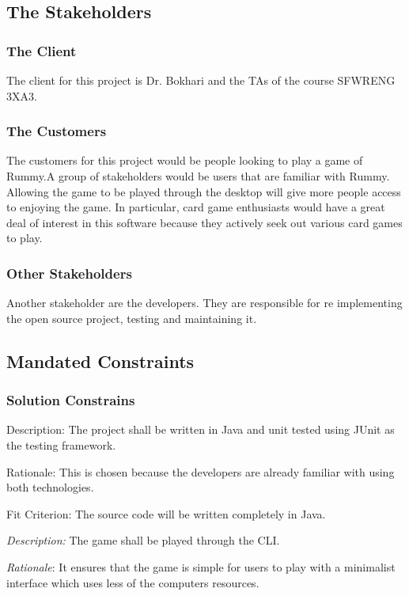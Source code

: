 \documentclass[12pt, titlepage]{article}
\begin{document}
\subsection{The Stakeholders}

\subsubsection{The Client}
The client for this project is Dr. Bokhari and the TAs of the course SFWRENG 3XA3. 

\subsubsection{The Customers}
The customers for this project would be people looking to play a game of Rummy.A group of stakeholders would be users that are familiar with Rummy. Allowing the game to be played through the desktop will give more people access to enjoying the game. In particular, card game enthusiasts would have a great deal of interest in this software because they actively seek out various card games to play. 


\subsubsection{Other Stakeholders}
Another stakeholder are the developers. They are responsible for re implementing the open source project, testing and maintaining it.
\subsection{Mandated Constraints}

\subsubsection{Solution Constrains}
Description: The project shall be written in Java and unit tested using JUnit as the testing framework.

Rationale: This is chosen because the developers are already familiar with using both technologies.

Fit Criterion: The source code will be written completely in Java.

\noindent \textit{Description:} The game shall be played through the CLI.

\textit{Rationale}: It ensures that the game is simple for users to play with a minimalist interface which uses less of the computers resources.
\end{document}

